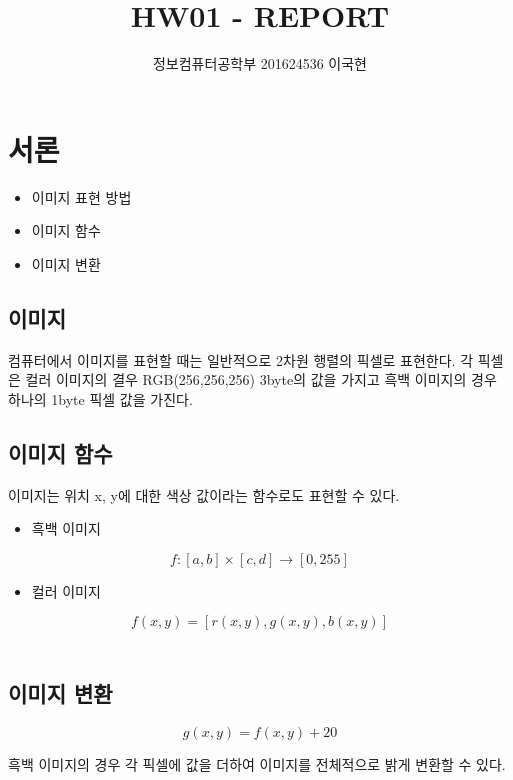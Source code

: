 \documentclass[]{report}
\title{HW01 - REPORT}
\author{정보컴퓨터공학부 201624536 이국현}
\begin{document}
\maketitle


\section{서론}

\begin{itemize}
	\item 이미지 표현 방법
	\item 이미지 함수
	\item 이미지 변환
\end{itemize}

\subsection{이미지}
컴퓨터에서 이미지를 표현할 때는 일반적으로 2차원 행렬의 픽셀로 표현한다. 각 픽셀은 컬러 이미지의 결우 RGB(256,256,256) 3byte의 값을 가지고 흑백 이미지의 경우 하나의 1byte 픽셀 값을 가진다.\\

\subsection{이미지 함수}

이미지는 위치 x, y에 대한 색상 값이라는 함수로도 표현할 수 있다. 


\begin{itemize}
	\item 흑백 이미지
\end{itemize}

\[ f: [a,b] \times [c,d] \rightarrow [0, 255] \]

\begin{itemize}
	\item 컬러 이미지
\end{itemize}

\[ f(x,y) = [r(x,y), g(x,y), b(x,y)] \] \\

\subsection{이미지 변환}


\[ g(x, y) = f(x, y) + 20 \]

흑백 이미지의 경우 각 픽셀에 값을 더하여 이미지를 전체적으로 밝게 변환할 수 있다.\\
\end{document}
